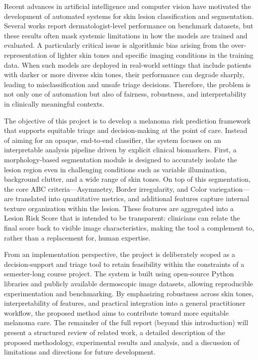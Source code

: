 \documentclass[conference]{IEEEtran}
\begin{document}
Recent advances in artificial intelligence and computer vision have motivated the development of automated systems for skin lesion classification and segmentation. Several works report dermatologist-level performance on benchmark datasets, but these results often mask systemic limitations in how the models are trained and evaluated. A particularly critical issue is algorithmic bias arising from the over-representation of lighter skin tones and specific imaging conditions in the training data. When such models are deployed in real-world settings that include patients with darker or more diverse skin tones, their performance can degrade sharply, leading to misclassification and unsafe triage decisions. Therefore, the problem is not only one of automation but also of fairness, robustness, and interpretability in clinically meaningful contexts.

The objective of this project is to develop a melanoma risk prediction framework that supports equitable triage and decision-making at the point of care. Instead of aiming for an opaque, end-to-end classifier, the system focuses on an interpretable analysis pipeline driven by explicit clinical biomarkers. First, a morphology-based segmentation module is designed to accurately isolate the lesion region even in challenging conditions such as variable illumination, background clutter, and a wide range of skin tones. On top of this segmentation, the core ABC criteria---Asymmetry, Border irregularity, and Color variegation---are translated into quantitative metrics, and additional features capture internal texture organization within the lesion. These features are aggregated into a Lesion Risk Score that is intended to be transparent: clinicians can relate the final score back to visible image characteristics, making the tool a complement to, rather than a replacement for, human expertise.

From an implementation perspective, the project is deliberately scoped as a decision-support and triage tool to retain feasibility within the constraints of a semester-long course project. The system is built using open-source Python libraries and publicly available dermoscopic image datasets, allowing reproducible experimentation and benchmarking. By emphasizing robustness across skin tones, interpretability of features, and practical integration into a general practitioner workflow, the proposed method aims to contribute toward more equitable melanoma care. The remainder of the full report (beyond this introduction) will present a structured review of related work, a detailed description of the proposed methodology, experimental results and analysis, and a discussion of limitations and directions for future development.
\end{document}
